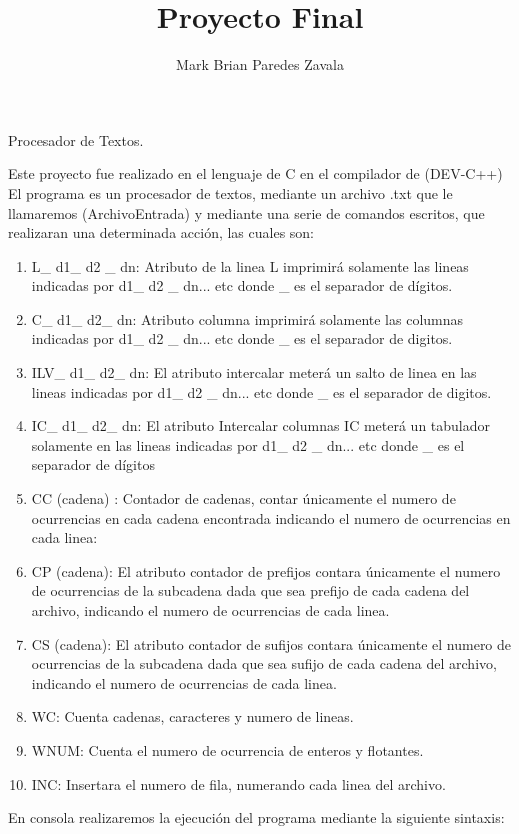 \documentclass[12pt,letterpaper]{report}
\author{Mark Brian Paredes Zavala}
\title{Proyecto Final}
\begin{document}
\maketitle

\begin{center}
Procesador de Textos.
\end{center}
Este proyecto fue realizado en el lenguaje de C en el compilador de (DEV-C++)\\ 
El programa es un procesador de textos, mediante un archivo .txt que le llamaremos (ArchivoEntrada) y mediante una serie de comandos escritos, que realizaran una determinada acción, las cuales son:\\ 

\begin{enumerate}
\item L\_ d1\_ d2 \_ dn: Atributo de la linea L imprimirá solamente las lineas indicadas por d1\_ d2 \_ dn... etc donde \_ es el separador de dígitos. 
\item C\_ d1\_ d2\_ dn: Atributo columna imprimirá solamente las columnas indicadas por d1\_ d2 \_ dn... etc donde \_ es el separador de digitos.
\item ILV\_ d1\_ d2\_ dn: El atributo intercalar meterá un salto de linea en  las lineas indicadas por d1\_ d2 \_ dn... etc donde \_ es el separador de digitos.
\item IC\_ d1\_ d2\_ dn: El atributo Intercalar columnas IC meterá un tabulador solamente en las lineas indicadas por d1\_ d2 \_ dn... etc donde \_ es el separador de dígitos
\item CC (cadena) : Contador de cadenas, contar únicamente el numero de ocurrencias en cada cadena encontrada indicando el numero de ocurrencias en cada linea:
\item CP (cadena): El atributo contador de prefijos contara únicamente el numero de ocurrencias de la subcadena dada que sea prefijo de cada cadena del archivo, indicando el numero de ocurrencias de cada linea.
\item CS (cadena): El atributo contador de sufijos contara únicamente el numero de ocurrencias de la subcadena dada que sea sufijo de cada cadena del archivo, indicando el numero de ocurrencias de cada linea.
\item WC: Cuenta cadenas, caracteres y numero de lineas.
\item WNUM: Cuenta el numero de ocurrencia de enteros y flotantes.
\item INC: Insertara el numero de fila, numerando cada linea del archivo.
\end{enumerate}
\newpage
En consola realizaremos la ejecución del programa mediante la siguiente sintaxis:\\\\
\end{document}
